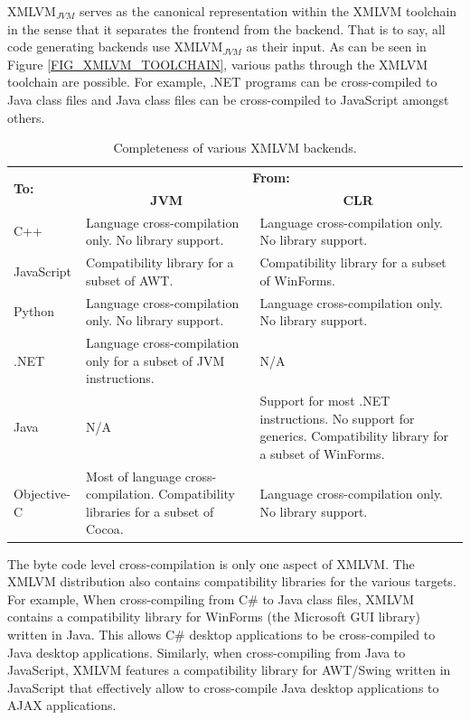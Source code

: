 \documentclass[11pt]{book}
\begin{document}
XMLVM$_{JVM}$ serves as the canonical representation within the XMLVM
toolchain in the sense that it separates the frontend from the
backend. That is to say, all code generating backends use
XMLVM$_{JVM}$ as their input. As can be seen in Figure
\ref{FIG_XMLVM_TOOLCHAIN}, various paths through the XMLVM toolchain
are possible. For example, .NET programs can be cross-compiled to Java
class files and Java class files can be cross-compiled to JavaScript
amongst others.


\begin{table}[h]
\caption{\label{TAB_XMLVM_COMPLETENESS} Completeness of various XMLVM backends.}
\centering
\begin{tabular}{|l||p{4.5cm}|p{4.5cm}|}
\hline
\multirow{2}{*}{\textbf{To:}}
    & \multicolumn{2}{c|}{\textbf{From:}} \\ \cline{2-3}
    & \multicolumn{1}{c|}{\textbf{JVM}}
    & \multicolumn{1}{c|}{\textbf{CLR}} \\ \hline \hline
C++
    & Language cross-compilation only. No library support.
    & Language cross-compilation only. No library support.  \\ \hline
JavaScript
    & Compatibility library for a subset of AWT.
    & Compatibility library for a subset of WinForms. \\ \hline
Python
    & Language cross-compilation only. No library support.
    & Language cross-compilation only. No library support. \\ \hline
.NET
    & Language cross-compilation only for a subset of JVM instructions.
    & N/A \\ \hline
Java
    & N/A
    & Support for most .NET instructions. No support for generics.
      Compatibility library for a subset of WinForms. \\ \hline
Objective-C
    & Most of language cross-compilation. Compatibility libraries
      for a subset of Cocoa.
    & Language cross-compilation only. No library support. \\ \hline
\end{tabular}
\end{table}


The byte code level cross-compilation is only one aspect of XMLVM. The
XMLVM distribution also contains compatibility libraries for the
various targets. For example, When cross-compiling from C\# to
Java class files, XMLVM contains a compatibility library for WinForms (the
Microsoft GUI library) written in Java. This allows C\# desktop
applications to be cross-compiled to Java desktop applications. Similarly,
when cross-compiling from Java to JavaScript, XMLVM features a
compatibility library for AWT/Swing written in JavaScript that
effectively allow to cross-compile Java desktop applications to AJAX
applications.
\end{document}
